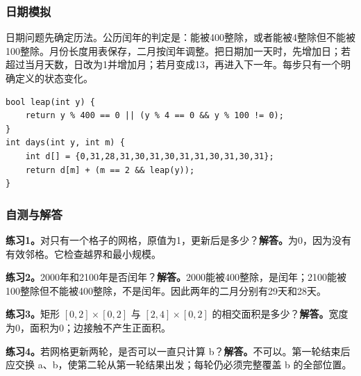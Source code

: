 \subsubsection{日期模拟}
日期问题先确定历法。公历闰年的判定是：能被400整除，或者能被4整除但不能被100整除。月份长度用表保存，二月按闰年调整。把日期加一天时，先增加日；若超过当月天数，日改为1并增加月；若月变成13，再进入下一年。每步只有一个明确定义的状态变化。

\begin{lstlisting}
bool leap(int y) {
    return y % 400 == 0 || (y % 4 == 0 && y % 100 != 0);
}
int days(int y, int m) {
    int d[] = {0,31,28,31,30,31,30,31,31,30,31,30,31};
    return d[m] + (m == 2 && leap(y));
}
\end{lstlisting}

\subsubsection{自测与解答}
\textbf{练习1。}对只有一个格子的网格，原值为1，更新后是多少？\textbf{解答。}为0，因为没有有效邻格。它检查越界和最小规模。

\textbf{练习2。}2000年和2100年是否闰年？\textbf{解答。}2000能被400整除，是闰年；2100能被100整除但不能被400整除，不是闰年。因此两年的二月分别有29天和28天。

\textbf{练习3。}矩形 $[0,2]\times[0,2]$ 与 $[2,4]\times[0,2]$ 的相交面积是多少？\textbf{解答。}宽度为0，面积为0；边接触不产生正面积。

\textbf{练习4。}若网格更新两轮，是否可以一直只计算 b？\textbf{解答。}不可以。第一轮结束后应交换 a、b，使第二轮从第一轮结果出发；每轮仍必须完整覆盖 b 的全部位置。
